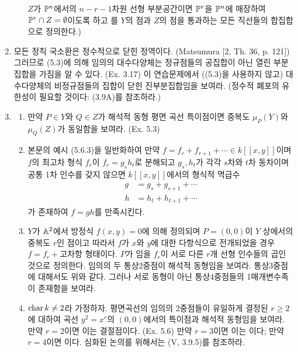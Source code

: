 \begin{enumerate}[label=\tb{5.\arabic*.},itemindent=0mm,itemsep=2mm]
\begin{enumerate}[label=(\alph*)]
	$Z$가 $\mathbb{P}^n$에서의 $n-r-1$차원 선형 부분공간이면 $\mathbb{P}^r$을 $\mathbb{P}^n$에 매장하여 $\mathbb{P}^r\cap Z=\emptyset$이도록 하고
	를 $Y$의 점과 $Z$의 점을 통과하는 모든 직선들의 합집합으로 정의한다.)
	\end{enumerate}
	\item 모든 정칙 국소환은 정수적으로 닫힌 정역이다. (Matsumura [2, Th. 36, p. 121])
	그러므로 (5.3)에 의해 임의의 대수다양체는 정규점들의 공집합이 아닌 열린 부분집합을 가짐을 알 수 있다. (Ex. 3.17)
	이 연습문제에서 ((5.3)을 사용하지 않고) 대수다양체의 비정규점들의 집합이 닫힌 진부분집합임을 보여라.
	(정수적 폐포의 유한성이 필요할 것이다: (3.9A)를 참조하라.)
	\item {}
	\begin{enumerate}[label=(\alph*)]
	\item 만약 $P\in Y$와 $Q\in Z$가 해석적 동형 평면 곡선 특이점이면 중복도 $\mu_P(Y)$와 $\mu_Q(Z)$가 동일함을 보여라. (Ex. 5.3)
	\item 본문의 예시 (5.6.3)을 일반화하여 만약 $f=f_r+f_{r+1}+\cdots\in k[[x,y]]$이며
	$f$의 최고차 형식 $f_r$이 $f_r=g_sh_t$로 분해되고 $g_s,h_t$가 각각 $s$차와 $t$차 동차이며
	공통 1차 인수를 갖지 않으면 $k[[x,y]]$에서의 형식적 멱급수
	\begin{align*}
	g&=g_s+g_{s+1}+\cdots\\h&=h_t+h_{t+1}+\cdots
	\end{align*}
	가 존재하여 $f=gh$를 만족시킨다.
	\item $Y$가 $\mathbb{A}^2$에서 방정식 $f(x,y)=0$에 의해 정의되며 $P=(0,0)$이 $Y$ 상에서의 중복도 $r$인 점이고
	따라서 $f$가 $x$와 $y$에 대한 다항식으로 전개되었을 경우 $f=f_r+$고차항 형태이다.
	$P$가 임을 $f_r$이 서로 다른 $r$개 선형 인수들의 곱인 것으로 정의한다.
	임의의 두 통상2중점이 해석적 동형임을 보여라. 통상3중점에 대해서도 위와 같다.
	그러나 서로 동형이 아닌 통상4중점들의 1매개변수족이 존재함을 보여라.
	\end{enumerate}
	\begin{enumerate}[label=*(\alph*)]
	\setcounter{enumii}{3}
	\item $\operatorname{char} k\ne 2$라 가정하자. 평면곡선의 임의의 2중점들이 유일하게 결정된 $r\ge 2$에 대하여
	곡선 $y^2=x^r$의 $(0,0)$에서의 특이점과 해석적 동형임을 보여라.
	만약 $r=2$이면 이는 결절점이다. (Ex. 5.6) 만약 $r=3$이면 이는 이다;
	만약 $r=4$이면 이다. 심화된 논의를 위해서는 (V, 3.9.5)를 참조하라.
	\end{enumerate}

\end{enumerate}
